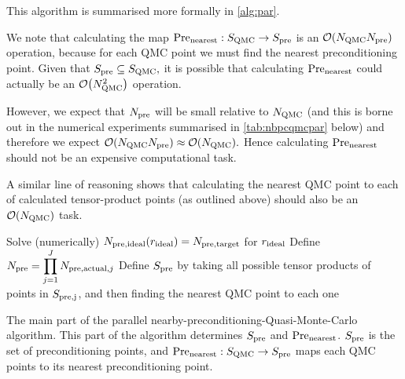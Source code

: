     This algorithm is summarised more formally in \cref{alg:par}.
    
    We note that calculating the map $\mathrm{Pre}_{\mathrm{nearest}}:S_{\mathrm{QMC}}\rightarrow S_{\mathrm{pre}}$ is an $\cO\mleft(\NQMC\Npre\mright)$ operation, because for each QMC point we must find the nearest preconditioning point. Given that $S_{\mathrm{pre}} \subseteq S_{\mathrm{QMC}},$ it is possible that calculating $\mathrm{Pre}_{\mathrm{nearest}}$ could actually be an $\cO\mleft(\NQMC^2\mright)$ operation.

    However, we expect that $N_{\mathrm{pre}}$ will be small relative to $N_{\mathrm{QMC}}$ (and this is borne out in the numerical experiments summarised in \cref{tab:nbpcqmcpar} below) and therefore we expect $\cO\mleft(\NQMC\Npre\mright) \approx \cO\mleft(\NQMC\mright).$ Hence calculating $\mathrm{Pre}_{\mathrm{nearest}}$ should not be an expensive computational task.

    A similar line of reasoning shows that calculating the nearest QMC point to each of calculated tensor-product points (as outlined above) should also be an $\cO\mleft(\NQMC\mright)$ task.
    \ere



\begin{algorithm}[h]
\DontPrintSemicolon
{}

\Input{$\Npretarget \in \NN$}
\BlankLine
Solve (numerically) $N_{\mathrm{pre,ideal}}(r_{\mathrm{ideal}}) = N_{\mathrm{pre,target}}$ for $r_{\mathrm{ideal}}$\;
Define $\displaystyle N_{\mathrm{pre}} = \prod_{j=1}^J N_{\mathrm{pre,actual},j}$\;
Define $S_{\mathrm{pre}}$ by taking all possible tensor products of points in $S_{\mathrm{pre,j}}$, and then finding the nearest QMC point to each one\;
\caption[The main part of the parallel nearby-preconditioning-Quasi-Monte-Carlo algorithm.]{The main part of the parallel nearby-preconditioning-Quasi-Monte-Carlo algorithm. This part of the algorithm determines $S_{\mathrm{pre}}$ and $\mathrm{Pre}_{\mathrm{nearest}}$. $S_{\mathrm{pre}}$ is the set of preconditioning points, and $\mathrm{Pre}_{\mathrm{nearest}}:S_{\mathrm{QMC}}\rightarrow S_{\mathrm{pre}}$ maps each QMC points to its nearest preconditioning point.\label{alg:par}}
\end{algorithm}

